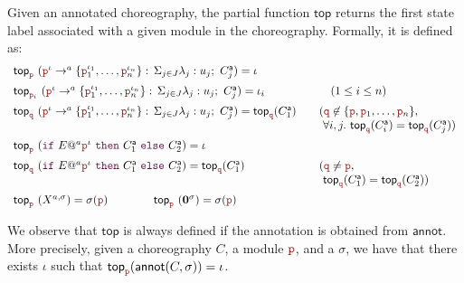 \newcommand{\toprole}{\mathsf{top}}

Given an annotated choreography, the partial function $\toprole$
returns the first state label associated with a given module in the
choreography.  Formally, it is defined as:
\[
  \begin{array}{lll}

    \toprole_{\nr}\ ( \interactl{\nr^{\iota}}a{\nr_1^{\iota_1},\ldots,\nr_n^{\iota_n}})
    = \iota
    \\[2mm]

    \toprole_{\nr_i}\ ( \interactl{\nr^{\iota}}a{\nr_1^{\iota_1},\ldots,\nr_n^{\iota_n}})
    = \iota_i
    &    \qquad (1 \le i \le n)
    \\[2mm]

    \toprole_{\nrr}\ ( \interactl{\nr^{\iota}}a{\nr_1^{\iota_1},\ldots,\nr_n^{\iota_n}})
    = \toprole_{\nrr}(\anno C_1)
    &  \quad (\nrr\not\in\{\nr,\nr_1,\ldots,\nr_n\},
    \\
    &  \quad\ \forall i,j.\
      \toprole_{\nrr}(\anno C_i)=\toprole_{\nrr}(\anno C_j))
    \\[2mm]

    \toprole_{\nr}\ (\ifTEl{E}a{\nr^{\iota}}{\anno C_1}{\anno C_2})
    = \iota
    \\[2mm]

    \toprole_{\nrr}\ ( \ifTEl{E}a{\nr^{\iota}}{\anno C_1}{\anno C_2})
    = \toprole_{\nrr}(\anno C_1)
    & \quad (\nrr\neq\nr,
    \\
    & \quad\ \toprole_{\nrr}(\anno C_1)=\toprole_{\nrr}(\anno C_2))
    \\[2mm]

    \toprole_{\nr}\ ( X^{a,\sigma})
    = \sigma(\nr)
    \qquad\qquad
    \toprole_{\nr}\ (\CEnd^{\sigma})
    = \sigma(\nr)
\end{array}
\]

We observe that $\toprole$ is always defined if the annotation is
obtained from $\mathsf{annot}$. More precisely, given a choreography
$C$, a module $\nr$, and a $\sigma$, we have that there exists $\iota$
such that $\toprole_{\nr}(\mathsf{annot}(C,\sigma))=\iota$.



